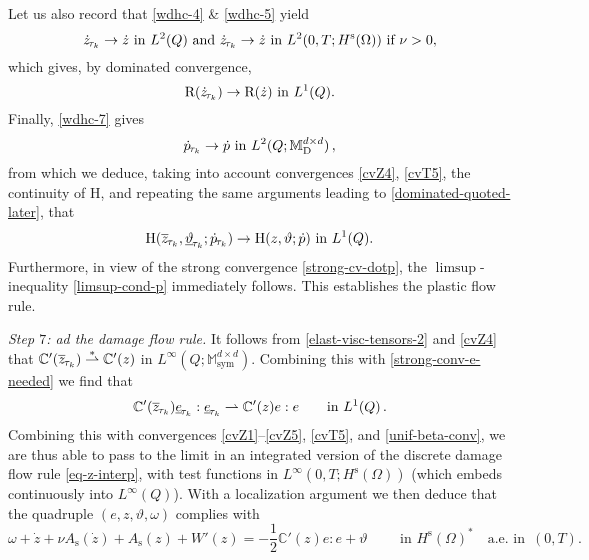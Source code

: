 \documentclass[a4paper,10pt,reqno]{amsart}
\numberwithin{equation}{section}
\newcommand{\bbM}{\mathbb{M}}
\numberwithin{equation}{section}
\newcommand{\weakto}{\rightharpoonup} %
\newcommand{\aein}{\text{a.e.\ in }}
\newcommand{\weaksto}{\overset{*}{\rightharpoonup}}
\newcommand{\teta}{\vartheta}
\newcommand{\piecewiseConstant}[2]{\overline{#1}_{\kern-1pt#2}}
\newcommand{\pwc}{\piecewiseConstant}
\newcommand{\upiecewiseConstant}[2]{\underline{#1}_{\kern-1pt#2}}
\newcommand{\upwc}{\upiecewiseConstant}
\newcommand{\piecewiseLinear}[2]{{#1}_{\kern-1pt#2}}
\newcommand{\pwl}{\piecewiseLinear}
\newcommand{\bbC}{\mathbb{C}}
\newcommand{\mt}{\bbM}
\newcommand{\sym}{\mathrm{sym}}
\newcommand{\dev}{\mathrm{D}}
\newcommand{\dip}[3]{\mathrm{H}(#1,#2;#3)}
\newcommand{\dipname}{\mathrm{H}}
\newcommand{\did}[1]{\mathrm{R}(#1)}
\newcommand{\spz}{H^{\mathrm{s}}(\Omega)}
\newcommand{\As}{A_{\mathrm{s}}}
\newcommand{\EEE}{\color{black}}
\newcommand{\MMM}{\color{black}}%
\begin{document}
Let us also record that  \eqref{wdhc-4} \&  \eqref{wdhc-5}
yield
\begin{equation}
\label{strong-cv-dotz}
\pwl{\dot z}{\tau_k} \to \dot{z}  \text{ in } L^2(Q) \text{ and }
\pwl{\dot z}{\tau_k} \to \dot{z} \text{ in } L^2(0,T; \spz) \text{ if } \nu >0,
\end{equation}
which gives, by dominated convergence, 
\begin{equation}
\label{strong-cv-R}
\did{\pwl{\dot z}{\tau_k}} \to \did{\dot{z}} \text{ in } L^1(Q).
\end{equation}
Finally, \eqref{wdhc-7} gives
\begin{equation}
\label{strong-cv-dotp}
\pwl{\dot p}{\tau_k} \to \dot{p}  \text{ in } L^2(Q;\mt_\dev^{d\times d})\,,
\end{equation}
from which we deduce, taking into account convergences \eqref{cvZ4}, \eqref{cvT5}, the continuity of $\dipname$, and repeating the same arguments leading to \eqref{dominated-quoted-later}, that 
\begin{equation}
\label{strong-cv-H}
\dip{\pwc z{\tau_k}}{\upwc \teta{\tau_k}}{\pwl{\dot p}{\tau_k} } \to \dip z\teta{\dot p} \text{ in } L^1(Q).
\end{equation}
Furthermore, in view of the strong convergence \eqref{strong-cv-dotp}, the $\limsup$-inequality \eqref{limsup-cond-p} immediately follows.  This establishes the plastic flow rule.
\par
\noindent
\emph{Step $7$: ad the damage  flow rule.}
It follows from \eqref{elast-visc-tensors-2} and \eqref{cvZ4} that 
$\bbC'(\pwc z{\tau_k}) \weaksto \bbC'(z)$ in $L^\infty(Q;\mt_\sym^{d\times d})$.
Combining this with 
\eqref{strong-conv-e-needed} we find that 
\[
\bbC'(\pwc z{\tau_k}) \upwc e{\tau_k} : \upwc e{\tau_k}  \weakto \bbC'(z) e:e \qquad \text{in }
\MMM L^1(Q)\,. \EEE
\]
\MMM Combining this with convergences
 \eqref{cvZ1}--\eqref{cvZ5},
 \eqref{cvT5}, and \eqref{unif-beta-conv},  we are thus able to pass to the limit in an integrated version of the 
 discrete damage flow rule \eqref{eq-z-interp}, with test functions in $L^\infty(0,T;\spz)$ (which embeds continuously into $L^\infty(Q)$). 
 With a localization argument we then deduce that \EEE
the quadruple $(e,z,\teta,\omega)$ complies with 
 \begin{equation}
 \label{almost-dam}
 \omega +\dot z+ \nu \As(\dot z) + \As(z) + W'(z) = -\frac12 \bbC'(z) e:e + \teta \qquad \text{ in } \spz^* \quad
 \aein\, (0,T).
 \end{equation}
\end{document}
